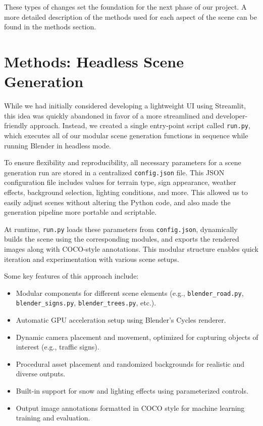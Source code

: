 \documentclass[journal]{IEEEtran}
\begin{document}
 These types of changes set the foundation for the next phase of our project. A more detailed description of the methods used for each aspect of the scene can be found in the methods section. 
 
 
 \section{Methods: Headless Scene Generation}
 
 While we had initially considered developing a lightweight UI using Streamlit, this idea was quickly abandoned in favor of a more streamlined and developer-friendly approach. Instead, we created a single entry-point script called \texttt{run.py}, which executes all of our modular scene generation functions in sequence while running Blender in headless mode.
 
 To ensure flexibility and reproducibility, all necessary parameters for a scene generation run are stored in a centralized \texttt{config.json} file. This JSON configuration file includes values for terrain type, sign appearance, weather effects, background selection, lighting conditions, and more. This allowed us to easily adjust scenes without altering the Python code, and also made the generation pipeline more portable and scriptable.
 
 At runtime, \texttt{run.py} loads these parameters from \texttt{config.json}, dynamically builds the scene using the corresponding modules, and exports the rendered images along with COCO-style annotations. This modular structure enables quick iteration and experimentation with various scene setups.
 
 Some key features of this approach include:
 
 \begin{itemize}
     \item Modular components for different scene elements (e.g., \texttt{blender\_road.py}, \texttt{blender\_signs.py}, \texttt{blender\_trees.py}, etc.).
     \item Automatic GPU acceleration setup using Blender's Cycles renderer.
     \item Dynamic camera placement and movement, optimized for capturing objects of interest (e.g., traffic signs).
     \item Procedural asset placement and randomized backgrounds for realistic and diverse outputs.
     \item Built-in support for snow and lighting effects using parameterized controls.
     \item Output image annotations formatted in COCO style for machine learning training and evaluation.
 \end{itemize}
 
\end{document}
